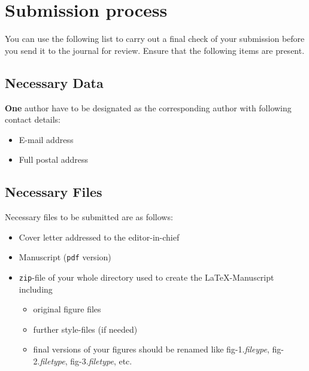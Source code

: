 \documentclass{techmech}
\begin{document}
\section{Submission process}
You can use the following list to carry out a final check of your submission before you send it to the journal for
review. Ensure that the following items are present.
\subsection{Necessary Data}
\textbf{One} author have to be designated as the corresponding author with following contact details:
\begin{itemize}
\item E-mail address
\item Full postal address
\end{itemize}
\subsection{Necessary Files}
Necessary files to be submitted are as follows:
\begin{itemize}
\item Cover letter addressed to the editor-in-chief
\item Manuscript (\texttt{pdf} version)
\item \texttt{zip}-file of your whole directory used to create the \LaTeX{}-Manuscript including
\begin{itemize}
\item original figure files %
\item further style-files (if needed)
\item final versions of your figures should be renamed like fig-1.\textit{fileype}, fig-2.\textit{filetype}, fig-3.\textit{filetype}, etc.
\end{itemize}
\end{itemize}
\end{document}
